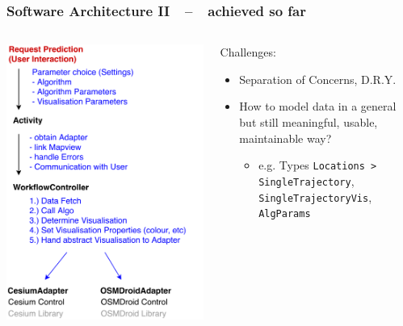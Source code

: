 \documentclass[xcolor=dvipsnames]{beamer}
\begin{document}
\begin{frame}
	\frametitle{\textbf{Software Architecture II}~~--~~achieved so far}
	\begin{columns}
	\begin{column}{0.5\textwidth}
		\includegraphics[width=\textwidth]{diagrams/controller-flow.pdf}
	\end{column}
	\begin{column}{0.5\textwidth}
		\fontsize{9pt}{7.2}\selectfont
		Challenges:
		\begin{itemize}
			\item Separation of Concerns, D.R.Y.
		 	 \item How to model data in a general but still meaningful, usable, maintainable way?
		 	 \begin{itemize}
		 	 	\item e.g. Types \lstinline$Locations > SingleTrajectory$, \lstinline$SingleTrajectoryVis$, \lstinline$AlgParams$
		 	 \end{itemize}
		\end{itemize}
 	\end{column}
	\end{columns}
\end{frame}
\end{document}
